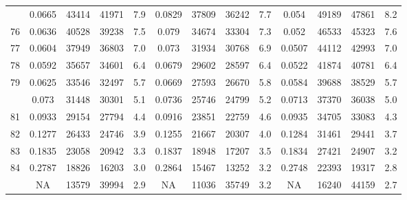 \documentclass[
  14pt,
]{article}
\begin{document}
\begin{longtable}[t]{lcccccccccccc}
\addlinespace
75 & 0.0665 & 43414 & 41971 & 7.9 & 0.0829 & 37809 & 36242 & 7.7 & 0.054 & 49189 & 47861 & 8.2\\
76 & 0.0636 & 40528 & 39238 & 7.5 & 0.079 & 34674 & 33304 & 7.3 & 0.052 & 46533 & 45323 & 7.6\\
77 & 0.0604 & 37949 & 36803 & 7.0 & 0.073 & 31934 & 30768 & 6.9 & 0.0507 & 44112 & 42993 & 7.0\\
78 & 0.0592 & 35657 & 34601 & 6.4 & 0.0679 & 29602 & 28597 & 6.4 & 0.0522 & 41874 & 40781 & 6.4\\
79 & 0.0625 & 33546 & 32497 & 5.7 & 0.0669 & 27593 & 26670 & 5.8 & 0.0584 & 39688 & 38529 & 5.7\\
\addlinespace
80 & 0.073 & 31448 & 30301 & 5.1 & 0.0736 & 25746 & 24799 & 5.2 & 0.0713 & 37370 & 36038 & 5.0\\
81 & 0.0933 & 29154 & 27794 & 4.4 & 0.0916 & 23851 & 22759 & 4.6 & 0.0935 & 34705 & 33083 & 4.3\\
82 & 0.1277 & 26433 & 24746 & 3.9 & 0.1255 & 21667 & 20307 & 4.0 & 0.1284 & 31461 & 29441 & 3.7\\
83 & 0.1835 & 23058 & 20942 & 3.3 & 0.1837 & 18948 & 17207 & 3.5 & 0.1834 & 27421 & 24907 & 3.2\\
84 & 0.2787 & 18826 & 16203 & 3.0 & 0.2864 & 15467 & 13252 & 3.2 & 0.2748 & 22393 & 19317 & 2.8\\
\addlinespace
85 & NA & 13579 & 39994 & 2.9 & NA & 11036 & 35749 & 3.2 & NA & 16240 & 44159 & 2.7\\*
\end{longtable}
\end{document}
